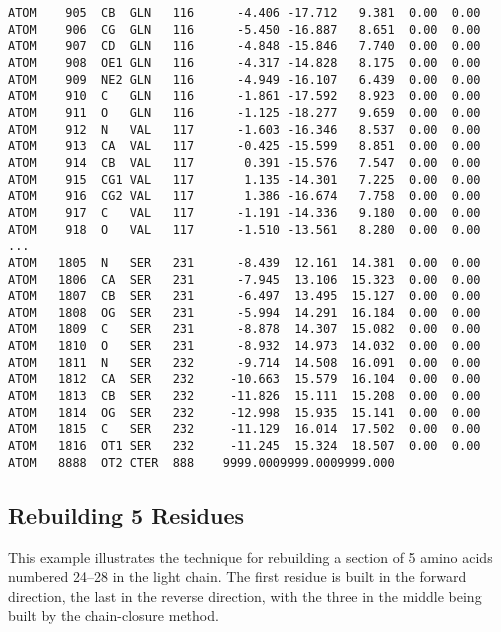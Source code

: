 \documentclass{report}
\begin{document}
\begin{verbatim}
ATOM    905  CB  GLN   116      -4.406 -17.712   9.381  0.00  0.00
ATOM    906  CG  GLN   116      -5.450 -16.887   8.651  0.00  0.00
ATOM    907  CD  GLN   116      -4.848 -15.846   7.740  0.00  0.00
ATOM    908  OE1 GLN   116      -4.317 -14.828   8.175  0.00  0.00
ATOM    909  NE2 GLN   116      -4.949 -16.107   6.439  0.00  0.00
ATOM    910  C   GLN   116      -1.861 -17.592   8.923  0.00  0.00
ATOM    911  O   GLN   116      -1.125 -18.277   9.659  0.00  0.00
ATOM    912  N   VAL   117      -1.603 -16.346   8.537  0.00  0.00
ATOM    913  CA  VAL   117      -0.425 -15.599   8.851  0.00  0.00
ATOM    914  CB  VAL   117       0.391 -15.576   7.547  0.00  0.00
ATOM    915  CG1 VAL   117       1.135 -14.301   7.225  0.00  0.00
ATOM    916  CG2 VAL   117       1.386 -16.674   7.758  0.00  0.00
ATOM    917  C   VAL   117      -1.191 -14.336   9.180  0.00  0.00
ATOM    918  O   VAL   117      -1.510 -13.561   8.280  0.00  0.00
...
ATOM   1805  N   SER   231      -8.439  12.161  14.381  0.00  0.00
ATOM   1806  CA  SER   231      -7.945  13.106  15.323  0.00  0.00
ATOM   1807  CB  SER   231      -6.497  13.495  15.127  0.00  0.00
ATOM   1808  OG  SER   231      -5.994  14.291  16.184  0.00  0.00
ATOM   1809  C   SER   231      -8.878  14.307  15.082  0.00  0.00
ATOM   1810  O   SER   231      -8.932  14.973  14.032  0.00  0.00
ATOM   1811  N   SER   232      -9.714  14.508  16.091  0.00  0.00
ATOM   1812  CA  SER   232     -10.663  15.579  16.104  0.00  0.00
ATOM   1813  CB  SER   232     -11.826  15.111  15.208  0.00  0.00
ATOM   1814  OG  SER   232     -12.998  15.935  15.141  0.00  0.00
ATOM   1815  C   SER   232     -11.129  16.014  17.502  0.00  0.00
ATOM   1816  OT1 SER   232     -11.245  15.324  18.507  0.00  0.00
ATOM   8888  OT2 CTER  888    9999.0009999.0009999.000
\end{verbatim}

\subsection{Rebuilding 5 Residues}
This example illustrates the technique for rebuilding a section of 
5 amino acids numbered 24--28 in the light chain. The first residue is 
built in the forward direction,
the last in the reverse direction, with the three in the middle
being built by the chain-closure method.
\end{document}
